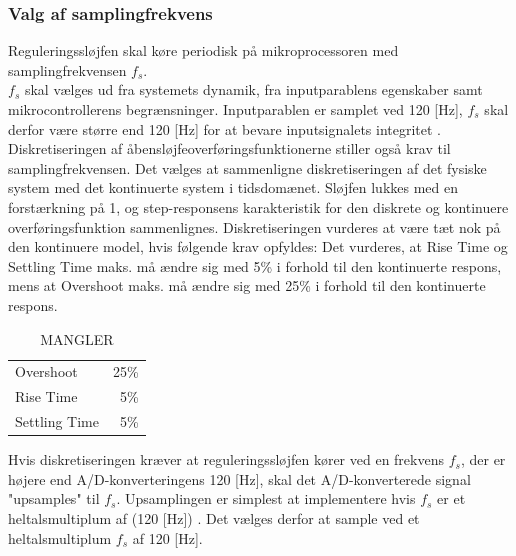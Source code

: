 \subsubsection{Valg af samplingfrekvens}\label{subsec:choosefs}
Reguleringssløjfen skal køre periodisk på mikroprocessoren
med samplingfrekvensen \(f_s\). \\
\(f_s\) skal vælges
ud fra systemets dynamik,
fra inputparablens egenskaber samt 
mikrocontrollerens begrænsninger. 
Inputparablen er samplet ved 120 [Hz], 
\(f_s\) skal derfor være større end 120 [Hz] for at bevare inputsignalets integritet \citep[s. 17]{dsp}. 
Diskretiseringen af åbensløjfeoverføringsfunktionerne stiller også krav til samplingfrekvensen.
Det vælges at sammenligne diskretiseringen af det fysiske system med det kontinuerte system i tidsdomænet.
Sløjfen lukkes med en forstærkning på 1, 
og step-responsens karakteristik for den diskrete og kontinuere overføringsfunktion sammenlignes. 
Diskretiseringen vurderes at være tæt nok på den kontinuere model, hvis følgende krav opfyldes:
Det vurderes, at Rise Time og Settling Time maks. må ændre sig med 5\% i forhold
til den kontinuerte respons, mens at Overshoot maks. må ændre sig med 25\% i forhold til
den kontinuerte respons.

\begin{table}
 \centering
\begin{tabular}{lr}
 Overshoot & 25\%\\
 Rise Time & 5\%\\
 Settling Time & 5\%\\
\end{tabular}
\caption[MANGLER]{MANGLER}
\end{table}

Hvis diskretiseringen kræver at reguleringssløjfen kører ved en frekvens \(f_s\),
der er højere end A/D-konverteringens 120 [Hz], skal det A/D-konverterede
signal "upsamples" til \(f_s\).
Upsamplingen er simplest at implementere
hvis \(f_s\) er et heltalsmultiplum af (120 [Hz]) \citep[s. 562]{dsp}.
Det vælges derfor at sample ved et heltalsmultiplum \(f_s\) af 120 [Hz].

